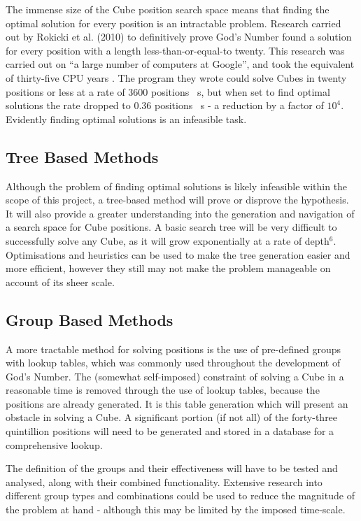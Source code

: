 \documentclass{report}
\begin{document}
	The immense size of the Cube position search space means that finding the optimal solution for every position is an intractable problem. Research carried out by Rokicki et al. (2010) to definitively prove God's Number found a solution for every position with a length less-than-or-equal-to twenty. This research was carried out on \enquote{a large number of computers at Google}, and took the equivalent of thirty-five CPU years \cite{Rokicki2010}. The program they wrote could solve Cubes in twenty positions or less at a rate of 3600 positions \si{\per\second}, but when set to find optimal solutions the rate dropped to 0.36 positions \si{\per\second} - a reduction by a factor of $10^4$. Evidently finding optimal solutions is an infeasible task.
    
	\subsection{Tree Based Methods}
	
	Although the problem of finding optimal solutions is likely infeasible within the scope of this project, a tree-based method will prove or disprove the hypothesis. It will also provide a greater understanding into the generation and navigation of a search space for Cube positions. A basic search tree will be very difficult to successfully solve any Cube, as it will grow exponentially at a rate of depth$^6$. Optimisations and heuristics can be used to make the tree generation easier and more efficient, however they still may not make the problem manageable on account of its sheer scale.
	
    \subsection{Group Based Methods}
    
    A more tractable method for solving positions is the use of pre-defined groups with lookup tables, which was commonly used throughout the development of God's Number. The (somewhat self-imposed) constraint of solving a Cube in a reasonable time is removed through the use of lookup tables, because the positions are already generated. It is this table generation which will present an obstacle in solving a Cube. A significant portion (if not all) of the forty-three quintillion positions will need to be generated and stored in a database for a comprehensive lookup.
    
    The definition of the groups and their effectiveness will have to be tested and analysed, along with their combined functionality. Extensive research into different group types and combinations could be used to reduce the magnitude of the problem at hand - although this may be limited by the imposed time-scale.
    
\end{document}
